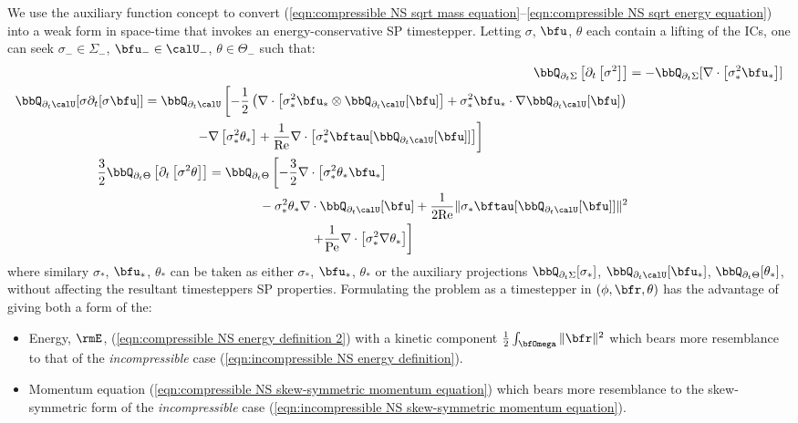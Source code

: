     We use the auxiliary function concept to convert (\ref{eqn:compressible NS sqrt mass equation}--\ref{eqn:compressible NS sqrt energy equation}) into a weak form in space-time that invokes an energy-conservative SP timestepper. Letting $\sigma$, $\bfu$, $\theta$ each contain a lifting of the ICs, one can seek $\sigma_{-} \in \Sigma_{-}$, $\bfu_{-} \in \calU_{-}$, $\theta \in \Theta_{-}$ such that:
    \begin{align}
            \bbQ_{\partial_{t}\Sigma}\left[\partial_{t}\left[\sigma^{2}\right]\right]
            &=  - \bbQ_{\partial_{t}\Sigma}[\nabla\cdot\left[\sigma_{*}^{2}\bfu_{*}\right]]  \\
        \begin{split}
            \bbQ_{\partial_{t}\calU}[\sigma\partial_{t}[\sigma\bfu]]
            &=  \bbQ_{\partial_{t}\calU}\left[- \frac{1}{2}\left(\nabla\cdot\left[\sigma_{*}^{2}\bfu_{*}\otimes\bbQ_{\partial_{t}\calU}[\bfu]\right] + \sigma_{*}^{2}\bfu_{*}\cdot\nabla\bbQ_{\partial_{t}\calU}[\bfu]\right)\right.  \\
            &\qquad\qquad\left.- \nabla\left[\sigma_{*}^{2}\theta_{*}\right]
            + \frac{1}{\rmRe}\nabla\cdot\left[\sigma_{*}^{2}\bftau[\bbQ_{\partial_{t}\calU}[\bfu]]\right]\right]
        \end{split}  \\
        \begin{split}
            \frac{3}{2}\bbQ_{\partial_{t}\Theta}\left[\partial_{t}\left[\sigma^{2}\theta\right]\right]
            &=  \bbQ_{\partial_{t}\Theta}\left[- \frac{3}{2}\nabla\cdot\left[\sigma_{*}^{2}\theta_{*}\bfu_{*}\right]\right.  \\
            &\qquad\qquad- \sigma_{*}^{2}\theta_{*}\nabla\cdot\bbQ_{\partial_{t}\calU}[\bfu]
            + \frac{1}{2\rmRe}\|\sigma_{*}\bftau[\bbQ_{\partial_{t}\calU}[\bfu]]\|^{2}  \\
            &\qquad\qquad\qquad\qquad\left.+ \frac{1}{\rmPe}\nabla\cdot\left[\sigma_{*}^{2}\nabla\theta_{*}\right]\right]
      \end{split}
    \end{align}
    where similary $\sigma_{*}$, $\bfu_{*}$, $\theta_{*}$ can be taken as either $\sigma_{*}$, $\bfu_{*}$, $\theta_{*}$ or the auxiliary projections $\bbQ_{\partial_{t}\Sigma}[\sigma_{*}]$, $\bbQ_{\partial_{t}\calU}[\bfu_{*}]$, $\bbQ_{\partial_{t}\Theta}[\theta_{*}]$, without affecting the resultant timesteppers SP properties.
    Formulating the problem as a timestepper in $(\phi, \bfr, \theta)$ has the advantage of giving both a form of the:
    \begin{itemize}
        \item  Energy, $\rmE$, (\ref{eqn:compressible NS energy definition 2}) with a kinetic component $\frac{1}{2}\int_{\bfOmega}\|\bfr\|^{2}$ which bears more resemblance to that of the \emph{incompressible} case (\ref{eqn:incompressible NS energy definition}).
        \item  Momentum equation (\ref{eqn:compressible NS skew-symmetric momentum equation}) which bears more resemblance to the skew-symmetric form of the \emph{incompressible} case (\ref{eqn:incompressible NS skew-symmetric momentum equation}).
    \end{itemize}
    

